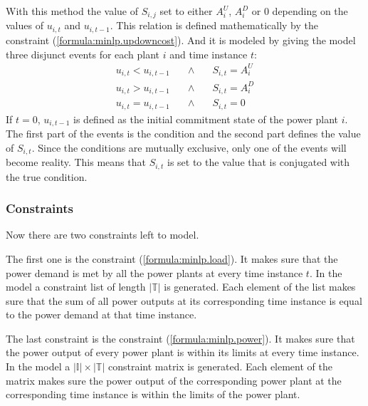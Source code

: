 With this method the value of $S_{i, j}$ set to either $A^U_i$, $A^D_i$ or $0$
depending on the values of $u_{i, t}$ and $u_{i, t-1}$.
This relation is defined mathematically by the constraint (\ref{formula:minlp.updowncost}).
And it is modeled by giving the model three disjunct events for each plant $i$ and time instance $t$:
\begin{subequations}
\begin{align}
  u_{i, t} < u_{i, t-1} \quad & \land & \quad S_{i, t} = A^U_i \\
  u_{i, t} > u_{i, t-1} \quad & \land & \quad S_{i, t} = A^D_i \\
  u_{i, t} = u_{i, t-1} \quad & \land & \quad S_{i, t} = 0
\end{align}
\end{subequations}
If $t = 0$, $u_{i, t-1}$ is defined as the initial commitment state of the power plant $i$.
The first part of the events is the condition and the second part defines the value of $S_{i, t}$.
Since the conditions are mutually exclusive,
only one of the events will become reality.
This means that $S_{i, t}$ is set to the value that is conjugated with the true condition.

\subsubsection{Constraints}

Now there are two constraints left to model.

The first one is the constraint (\ref{formula:minlp.load}).
It makes sure that the power demand is met by all the power plants at every time instance $t$.
In the model a constraint list of length $|\mathbb{T}|$ is generated.
Each element of the list makes sure that the sum of all power outputs at its corresponding time instance
is equal to the power demand at that time instance.

The last constraint is the constraint (\ref{formula:minlp.power}).
It makes sure that the power output of every power plant is within its limits at every time instance.
In the model a $|\mathbb{I}| \times |\mathbb{T}|$ constraint matrix is generated.
Each element of the matrix makes sure the power output of the corresponding power plant
at the corresponding time instance is within the limits of the power plant.

